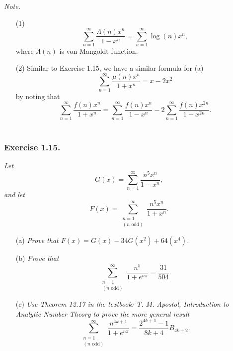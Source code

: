 \documentclass{article}
\begin{document}
\emph{Note.}
\begin{enumerate}
\item[(1)]
  \[
    \sum_{n=1}^{\infty} \frac{\Lambda(n)x^n}{1-x^n}
    = \sum_{n=1}^{\infty} \log(n) x^n,
  \]
  where $\Lambda(n)$ is von Mangoldt function.

\item[(2)]
  Similar to Exercise 1.15,
  we have a similar formula for (a)
  \[
    \sum_{n=1}^{\infty} \frac{\mu(n)x^n}{1+x^n} = x-2x^2
  \]
  by noting that
  \[
    \sum_{n=1}^{\infty} \frac{f(n)x^n}{1+x^n}
    =
    \sum_{n=1}^{\infty} \frac{f(n)x^n}{1-x^n} - 2 \sum_{n=1}^{\infty} \frac{f(n)x^{2n}}{1-x^{2n}}.
  \] \\
\end{enumerate}






\subsubsection*{Exercise 1.15.}
\emph{Let
\[
  G(x) = \sum_{n=1}^{\infty} \frac{n^5 x^n}{1-x^n},
\]
and let
\[
  F(x) = \sum_{\substack{n=1 \\ (\text{$n$ odd})}}^{\infty} \frac{n^5 x^n}{1+x^n}.
\]}
\begin{enumerate}
\item[(a)]
  \emph{Prove that $F(x) = G(x) - 34G(x^2) + 64(x^4)$.}

\item[(b)]
  \emph{Prove that
  \[
    \sum_{\substack{n=1 \\ (\text{$n$ odd})}}^{\infty} \frac{n^5}{1+e^{n\pi}}
    = \frac{31}{504}.
  \]}

\item[(c)]
  \emph{Use Theorem 12.17 in the textbook: T. M. Apostol, Introduction to Analytic Number Theory
  to prove the more general result}
  \[
    \sum_{\substack{n=1 \\ (\text{$n$ odd})}}^{\infty} \frac{n^{4k+1}}{1+e^{n\pi}}
    = \frac{2^{4k+1}-1}{8k+4}B_{4k+2}.
  \]
\end{enumerate}
\end{document}
